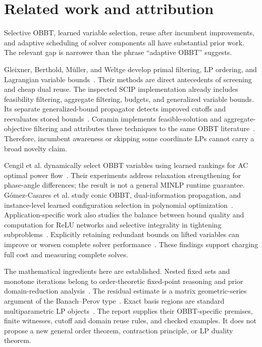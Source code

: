 \section{Related work and attribution}\label{sec:literature}

Selective OBBT, learned variable selection, reuse after incumbent
improvements, and adaptive scheduling of solver components all have
substantial prior work. The relevant gap is narrower than the phrase
``adaptive OBBT'' suggests.

Gleixner, Berthold, M\"uller, and Weltge develop primal filtering, LP
ordering, and Lagrangian variable bounds~\cite{gleixner2017enhancements}.
Their methods are direct antecedents of screening and cheap dual reuse.
The inspected SCIP implementation already includes feasibility filtering,
aggregate filtering, budgets, and generalized variable bounds. Its
separate generalized-bound propagator detects improved cutoffs and
reevaluates stored bounds~\cite{scip2026obbt}. Coramin implements
feasible-solution and aggregate-objective filtering and attributes these
techniques to the same OBBT literature~\cite{coramin2023filters}.
Therefore, incumbent awareness or skipping some coordinate LPs cannot
carry a broad novelty claim.

Cengil et al. dynamically select OBBT variables using learned rankings
for AC optimal power flow~\cite{cengil2025learning}. Their experiments
address relaxation strengthening for phase-angle differences; the result
is not a general MINLP runtime guarantee. G\'omez-Casares et al. study
conic OBBT, dual-information propagation, and instance-level learned
configuration selection in polynomial optimization~\cite{gomezcasares2025domain}.
Application-specific work also studies the balance between bound quality
and computation for ReLU networks and selective integrality in tightening
subproblems~\cite{badilla2024tradeoffs,pineda2025sweetspot}.
Explicitly retaining redundant bounds on lifted variables can improve
or worsen complete solver performance~\cite{gonzalezdiaz2025lifted}.
These findings support charging full cost and measuring complete solves.

The mathematical ingredients here are established. Nested fixed sets
and monotone iterations belong to order-theoretic fixed-point reasoning
and prior domain-reduction analysis~\cite{tarski1955fixpoint,caprara2010domain,caprara2016theoretical,belotti2012fbbt}.
The residual estimate is a matrix geometric-series argument of the
Banach--Perov type~\cite{jachymski2016perov}. Exact basis regions are
standard multiparametric LP objects~\cite{borrelli2003parametric}.
The report supplies their OBBT-specific premises, finite witnesses,
cutoff and domain reuse rules, and checked examples. It does not propose
a new general order theorem, contraction principle, or LP duality theorem.

